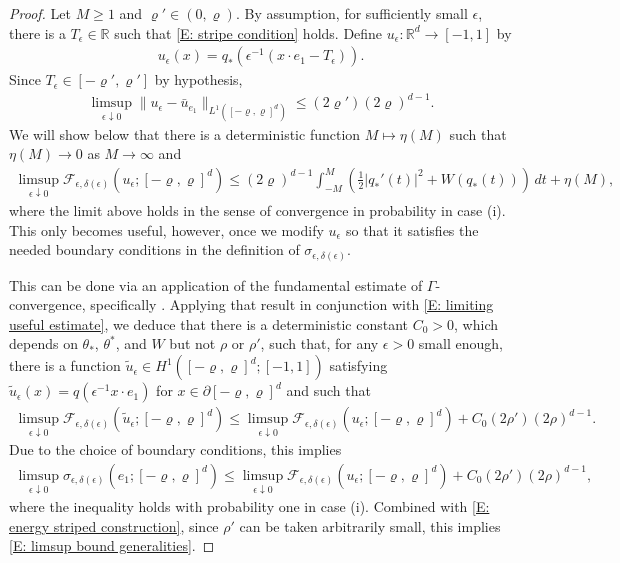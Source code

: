 \documentclass[10pt,a4paper]{amsart}
\begin{document}
\begin{proof}
    Let $M \geq 1$ and $\varrho' \in (0,\varrho)$.  By assumption, for sufficiently small $\epsilon$, there is a $T_{\epsilon} \in \mathbb{R}$ such that \eqref{E: stripe condition} holds.  Define $u_{\epsilon} : \mathbb{R}^{d} \to [-1,1]$ by
		\begin{align*}
			u_{\epsilon}(x) = q_{*} ( \epsilon^{-1} ( x \cdot e_{1} - T_{\epsilon} ) ).
		\end{align*}
	Since $T_{\epsilon} \in [-\varrho',\varrho']$ by hypothesis,
		\begin{align} \label{E: limiting useful estimate}
			\limsup_{ \epsilon \downarrow 0 } \| u_{\epsilon} - \bar{u}_{e_{1}} \|_{L^{1}([-\varrho,\varrho]^{d})} \leq (2 \varrho') (2\varrho)^{d-1} .
		\end{align}
	We will show below that there is a deterministic function $M \mapsto \eta(M)$ such that $\eta(M) \to 0$ as $M \to \infty$ and
		\begin{align} \label{E: energy striped construction}
			\limsup_{ \epsilon \downarrow 0 } \mathscr{F}_{\epsilon,\delta(\epsilon)} ( u_{\epsilon} ; [-\varrho,\varrho]^{d} ) \leq ( 2 \varrho )^{d-1} \int_{-M}^{M} \left( \frac{1}{2} | q_{*}'(t) |^{2} + W(q_{*}(t)) \right) \, dt + \eta(M),
		\end{align}
	where the limit above holds in the sense of convergence in probability in case (i).  This only becomes useful, however, once we modify $u_{\epsilon}$ so that it satisfies the needed boundary conditions in the definition of $\sigma_{\epsilon,\delta(\epsilon)}$.

    This can be done via an application of the fundamental estimate of $\Gamma$-convergence, specifically \cite[Theorem 6]{morfe}.  Applying that result in conjunction with \eqref{E: limiting useful estimate}, we deduce that  there is a deterministic constant $C_{0} > 0$, which depends on $\theta_{*}$, $\theta^{*}$, and $W$ but not $\rho$ or $\rho'$, such that, for any $\epsilon > 0$ small enough, there is a function $\tilde{u}_{\epsilon} \in H^{1}([-\varrho,\varrho]^{d};[-1,1])$ satisfying $\tilde{u}_{\epsilon}(x) = q(\epsilon^{-1} x \cdot e_{1} )$ for $x \in \partial [-\varrho,\varrho]^{d}$ and such that
        \begin{align*}
            \limsup_{ \epsilon \downarrow 0 } \mathscr{F}_{\epsilon,\delta(\epsilon)} (\tilde{u}_{\epsilon}; [-\varrho,\varrho]^{d}) \leq \limsup_{ \epsilon \downarrow 0 } \mathscr{F}_{\epsilon,\delta(\epsilon)}(u_{\epsilon}; [-\varrho,\varrho]^{d}) + C_{0} ( 2 \rho' ) ( 2 \rho )^{d-1} .  
        \end{align*}
    Due to the choice of boundary conditions, this implies
        \begin{align*}
            \limsup_{ \epsilon \downarrow 0 } \sigma_{\epsilon,\delta(\epsilon)}(e_{1};[-\varrho,\varrho]^{d}) \leq \limsup_{ \epsilon \downarrow 0 } \mathscr{F}_{\epsilon,\delta(\epsilon)}(u_{\epsilon}; [-\varrho,\varrho]^{d}) + C_{0} ( 2 \rho' ) ( 2 \rho )^{d-1},
        \end{align*}
     where the inequality holds with probability one in case (i).  Combined with \eqref{E: energy striped construction}, since $\rho'$ can be taken arbitrarily small, this implies \eqref{E: limsup bound generalities}.
	

\end{proof}
\end{document}
